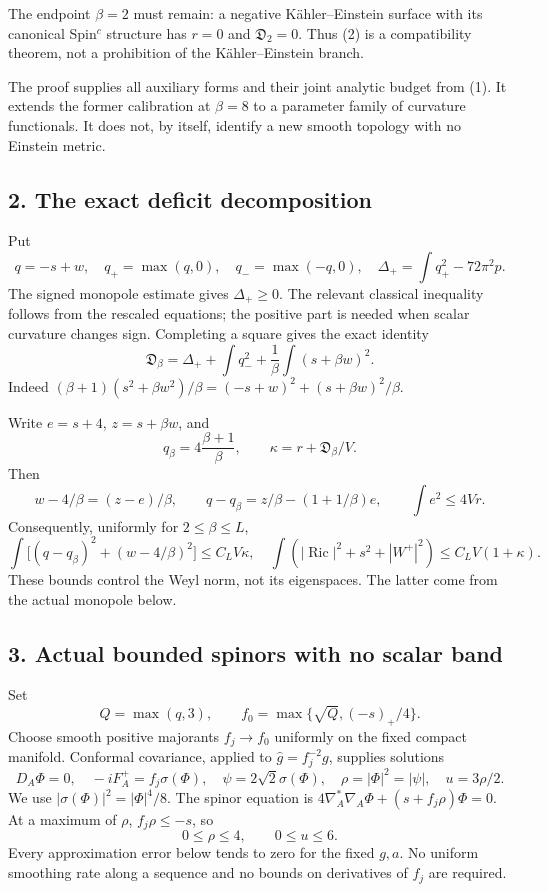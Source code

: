 \documentclass[
  10pt,
]{article}
\begin{document}
The endpoint \(\beta=2\) must remain: a negative Kähler--Einstein
surface with its canonical Spin\(^c\) structure has \(r=0\) and
\(\mathfrak D_2=0\). Thus (2) is a compatibility theorem, not a
prohibition of the Kähler--Einstein branch.

The proof supplies all auxiliary forms and their joint analytic budget
from (1). It extends the former calibration at \(\beta=8\) to a
parameter family of curvature functionals. It does not, by itself,
identify a new smooth topology with no Einstein metric.

\hypertarget{the-exact-deficit-decomposition}{%
\subsection{2. The exact deficit
decomposition}\label{the-exact-deficit-decomposition}}

Put \[
q=-s+w,\quad q_+=\max(q,0),\quad q_-=\max(-q,0),\quad
\Delta_+=\int q_+^2-72\pi^2p.
\] The signed monopole estimate gives \(\Delta_+\ge0\). The relevant
classical inequality follows from the rescaled equations; the positive
part is needed when scalar curvature changes sign. Completing a square
gives the exact identity \[
\boxed{
\mathfrak D_\beta
=\Delta_++\int q_-^2+\frac1\beta\int(s+\beta w)^2.
}
\tag{5}
\] Indeed
\((\beta+1)(s^2+\beta w^2)/\beta =(-s+w)^2+(s+\beta w)^2/\beta\).

Write \(e=s+4\), \(z=s+\beta w\), and \[
q_\beta=4\frac{\beta+1}{\beta},\qquad
\kappa=r+\mathfrak D_\beta/V.
\] Then \[
w-4/\beta=(z-e)/\beta,\qquad
q-q_\beta=z/\beta-(1+1/\beta)e,\qquad
\int e^2\le4Vr.
\tag{6}
\] Consequently, uniformly for \(2\le\beta\le L\), \[
\int\bigl[(q-q_\beta)^2+(w-4/\beta)^2\bigr]
\le C_L V\kappa,
\quad
\int(|\operatorname{Ric}|^2+s^2+|W^+|^2)
\le C_L V(1+\kappa).
\tag{7}
\] These bounds control the Weyl norm, not its eigenspaces. The latter
come from the actual monopole below.

\hypertarget{actual-bounded-spinors-with-no-scalar-band}{%
\subsection{3. Actual bounded spinors with no scalar
band}\label{actual-bounded-spinors-with-no-scalar-band}}

Set \[
Q=\max(q,3),\qquad
f_0=\max\{\sqrt Q,(-s)_+/4\}.
\] Choose smooth positive majorants \(f_j\to f_0\) uniformly on the
fixed compact manifold. Conformal covariance, applied to
\(\widehat g=f_j^{-2}g\), supplies solutions \[
D_A\Phi=0,\quad -iF_A^+=f_j\sigma(\Phi),\quad
\psi=2\sqrt2\sigma(\Phi),\quad
\rho=|\Phi|^2=|\psi|,\quad u=3\rho/2.
\tag{8}
\] We use \(|\sigma(\Phi)|^2=|\Phi|^4/8\). The spinor equation is
\(4\nabla_A^*\nabla_A\Phi+(s+f_j\rho)\Phi=0\). At a maximum of \(\rho\),
\(f_j\rho\le-s\), so \[
0\le\rho\le4,\qquad 0\le u\le6.
\tag{9}
\] Every approximation error below tends to zero for the fixed \(g,a\).
No uniform smoothing rate along a sequence and no bounds on derivatives
of \(f_j\) are required.
\end{document}
